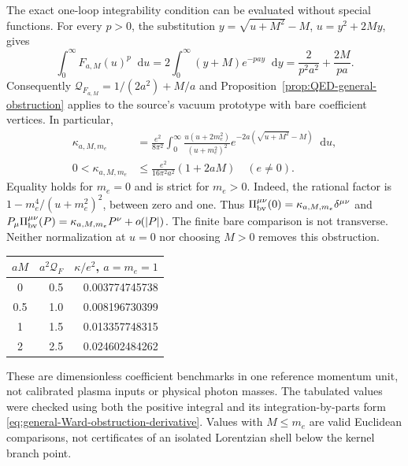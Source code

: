 \documentclass[final,5p,times,twocolumn,numbers,nopreprintline]{elsarticle}
\numberwithin{equation}{section}
\theoremstyle{definition}
\theoremstyle{remark}
\newcommand{\dd}{\mathop{}\!\mathrm d}
\begin{document}
The exact one-loop integrability condition can be evaluated without
special functions. For every \(p>0\), the substitution
\(y=\sqrt{u+M^2}-M\), \(u=y^2+2My\), gives
\begin{equation}
 \int_0^\infty F_{a,M}(u)^p\dd u
   =2\int_0^\infty(y+M)e^{-pa y}\dd y
   =\frac{2}{p^2a^2}+\frac{2M}{pa}.
\label{eq:OQED-kernel-Lp}
\end{equation}
Consequently \(\mathcal Q_{F_{a,M}}=1/(2a^2)+M/a\) and
Proposition~\ref{prop:QED-general-obstruction} applies to the source's
vacuum prototype with bare coefficient vertices. In particular,
\begin{equation}
\begin{aligned}
 \kappa_{a,M,m_e}
 &=\frac{e^2}{8\pi^2}\int_0^\infty
  \frac{u(u+2m_e^2)}{(u+m_e^2)^2}
  e^{-2a(\sqrt{u+M^2}-M)}\dd u,\\
 0<\kappa_{a,M,m_e}
 &\leq\frac{e^2}{16\pi^2a^2}(1+2aM)\quad(e\ne0).
\end{aligned}
\label{eq:OQED-explicit-Ward-obstruction}
\end{equation}
Equality holds for \(m_e=0\) and is strict for \(m_e>0\).
Indeed, the rational factor is
\(1-m_e^4/(u+m_e^2)^2\), between zero and one. Thus
\(\Pi_{\rm bv}^{\mu\nu}(0)=\kappa_{a,M,m_e}\delta^{\mu\nu}\)
and \(P_\mu\Pi_{\rm bv}^{\mu\nu}(P)
=\kappa_{a,M,m_e}P^\nu+o(|P|)\). The finite bare comparison
is not transverse. Neither normalization at \(u=0\) nor choosing
\(M>0\) removes this obstruction.

\begin{center}
\small
\begin{tabular}{@{}crr@{}}
\toprule
\(aM\) & \(a^2\mathcal Q_F\) & \(\kappa/e^2\), \(a=m_e=1\)\\
\midrule
0 & 0.5 & 0.003774745738\\
0.5 & 1.0 & 0.008196730399\\
1 & 1.5 & 0.013357748315\\
2 & 2.5 & 0.024602484262\\
\bottomrule
\end{tabular}
\end{center}
These are dimensionless coefficient benchmarks in one reference
momentum unit, not calibrated plasma inputs or physical photon masses.
The tabulated values were checked using both the positive integral and
its integration-by-parts form
\eqref{eq:general-Ward-obstruction-derivative}. Values with \(M\leq m_e\)
are valid Euclidean comparisons, not certificates of an isolated
Lorentzian shell below the kernel branch point.
\end{document}
